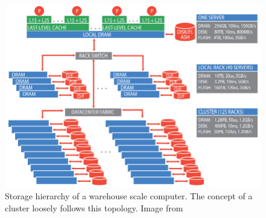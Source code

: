 \begin{figure} [!h]
\centering
\includegraphics[scale=.35]{methodology/images/cluster_storage_hierarchy.png}
\caption[Cluster Storage Hierarchy]{Storage hierarchy of a warehouse scale computer. The concept of a cluster loosely follows this topology. Image from \cite{barroso18}}
\label{img_cluster_storage_hierarchy}
\end{figure}